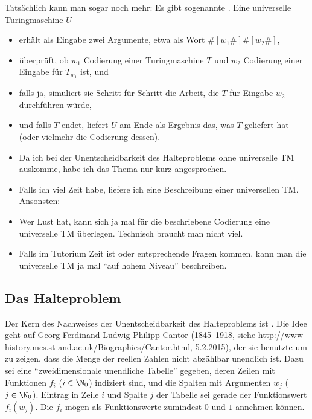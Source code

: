 Tatsächlich kann man sogar noch mehr: Es gibt sogenannte
. Eine universelle
Turingmaschine $U$
\begin{itemize}
\item erhält als Eingabe zwei Argumente, etwa als Wort
  $\#[w_1\#]\#[w_2\#]$,
\item überprüft, ob $w_1$ Codierung einer Turingmaschine $T$ und $w_2$
  Codierung einer Eingabe für $T_{w_1}$ ist, und
\item falls ja, simuliert sie Schritt für Schritt die Arbeit, die $T$
  für Eingabe $w_2$ durchführen würde,
\item und falls $T$ endet, liefert $U$ am Ende als Ergebnis das, was
  $T$ geliefert hat (oder vielmehr die Codierung dessen).
\end{itemize}

\begin{tutorium}
  \begin{itemize}
  \item Da ich bei der Unentscheidbarkeit des Halteproblems ohne
    universelle TM auskomme, habe ich das Thema nur kurz
    angesprochen.
  \item Falls ich viel Zeit habe, liefere ich eine Beschreibung
    einer universellen TM. Ansonsten:
  \item Wer Lust hat, kann sich ja mal für die beschriebene
    Codierung eine universelle TM überlegen. Technisch braucht man
    nicht viel.
  \item Falls im Tutorium Zeit ist oder entsprechende Fragen kommen,
    kann man die universelle TM ja mal "`auf hohem Niveau"'
    beschreiben.
  \end{itemize}
\end{tutorium}

\Tut\subsection{Das Halteproblem}
\label{subsec:halteproblem}

Der Kern des Nachweises der Unentscheidbarkeit des Halteproblems
ist . Die Idee geht
auf Georg Ferdinand Ludwig Philipp Cantor (1845--1918, siehe \zB
\url{http://www-history.mcs.st-and.ac.uk/Biographies/Cantor.html},
5.2.2015), der sie benutzte um zu zeigen, dass die Menge der reellen
Zahlen nicht abzählbar unendlich ist. Dazu sei eine "`zweidimensionale
unendliche Tabelle"' gegeben, deren Zeilen mit Funktionen $f_i$
($i\in\N_0$) indiziert sind, und die Spalten mit Argumenten $w_j$
($j\in\N_0$).  Eintrag in Zeile $i$ und Spalte $j$ der Tabelle sei
gerade der Funktionswert $f_i(w_j)$. Die $f_i$ mögen als
Funktionswerte zumindest $0$ und $1$ annehmen können.

